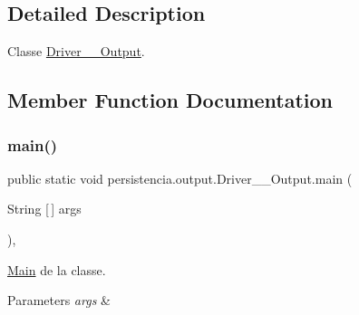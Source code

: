\subsection{Detailed Description}
Classe \hyperlink{classpersistencia_1_1output_1_1Driver____Output}{Driver\+\_\+\+\_\+\+Output}. 

\subsection{Member Function Documentation}
\mbox{\label{classpersistencia_1_1output_1_1Driver____Output_a1fcfdd813a7c5460772e74b5709fc030}} 
\subsubsection{\texorpdfstring{main()}{main()}}
{\footnotesize\ttfamily public static void persistencia.\+output.\+Driver\+\_\+\+\_\+\+Output.\+main (\begin{DoxyParamCaption}\item[{String \mbox{[}$\,$\mbox{]}}]{args }\end{DoxyParamCaption})\hspace{0.3cm}{\ttfamily [inline]}, {\ttfamily [static]}}



\hyperlink{classMain}{Main} de la classe. 


\begin{DoxyParams}{Parameters}
{\em args} & \\
\hline
\end{DoxyParams}

